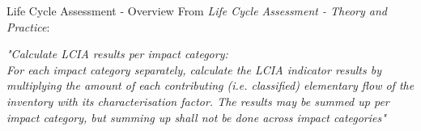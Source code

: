\newcommand{\red}[1]{{\color{red}#1}}
\begin{frame}{Life Cycle Assessment - Overview}
From \textit{Life Cycle Assessment - Theory and Practice}:
\begin{center} \color{darkgray}
    \textit{"Calculate LCIA results per impact category:\\ 
    For each impact category separately, calculate the LCIA indicator results by \red{multiplying} the amount of each contributing (i.e. classified) \red{elementary flow} of the inventory with its \red{characterisation factor}. The results may be \red{summed up per impact category}, but summing up shall not be done across impact categories"}
\end{center}
\end{frame}